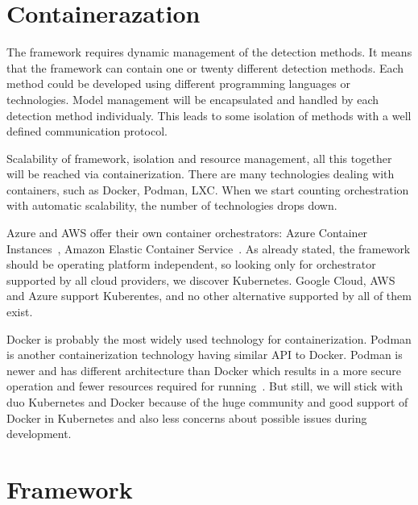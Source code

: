 \section{Containerazation}

The framework requires dynamic management of the detection methods. It means that the framework can contain one or twenty different detection methods. Each method could be developed using different programming languages or technologies. Model management will be encapsulated and handled by each detection method individualy. This leads to some isolation of methods with a well defined communication protocol. 

Scalability of framework, isolation and resource management, all this together will be reached via containerization. There are many technologies dealing with containers, such as Docker, Podman, LXC. When we start counting orchestration with automatic scalability, the number of technologies drops down.

Azure and AWS offer their own container orchestrators: Azure Container Instances~\cite{AzureOrchestrators}, Amazon Elastic Container Service~\cite{AWSOrchestrators}. As already stated, the framework should be operating platform independent, so looking only for orchestrator supported by all cloud providers, we discover Kubernetes. Google Cloud, AWS and Azure support Kuberentes, and no other alternative supported by all of them exist.~\cite{AzureOrchestrators}~\cite{AWSOrchestrators}~\cite{GoogleOrchestrators}

Docker is probably the most widely used technology for containerization. Podman is another containerization technology having similar API to Docker. Podman is newer and has different architecture than Docker which results in a more secure operation and fewer resources required for running~\cite{DockerPodman}. But still, we will stick with duo Kubernetes and Docker because of the huge community and good support of Docker in Kubernetes and also less concerns about possible issues during development.

\section{Framework}

